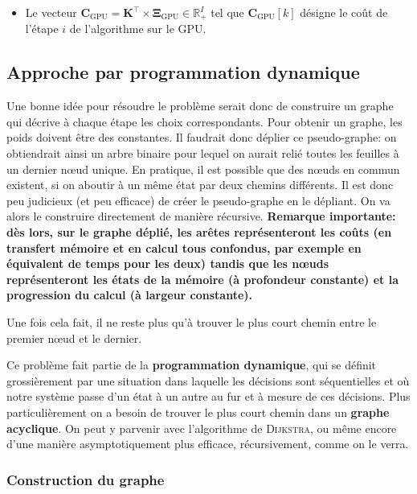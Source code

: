 \documentclass[svgnames,dvipsnames,a4paper,10pt,french]{report}
\begin{document}
\begin{appendices}
\begin{itemize}
    \item Le vecteur $\mathbf{C}_{\text{GPU}} = \mathbf{K}^\intercal \times  \mathbf{\Xi}_{\text{GPU}} \in \mathbb{R}_+^{I}$ tel que $\mathbf{C}_{\text{GPU}}[k]$ désigne le coût de l'étape $i$ de l'algorithme sur le GPU.
\end{itemize}

\subsection{Approche par programmation dynamique}
Une bonne idée pour résoudre le problème serait donc de construire un graphe qui décrive à chaque étape les choix correspondants.  Pour obtenir un graphe, les poids doivent être des constantes. Il faudrait donc \og déplier \fg{} ce pseudo-graphe: on obtiendrait ainsi un arbre binaire pour lequel on aurait relié toutes les feuilles à un dernier n\oe{}ud unique. En pratique, il est  possible que des n\oe{}uds en commun existent, si on aboutir à un même état par deux chemins différents. Il est donc peu judicieux (et peu efficace) de créer le pseudo-graphe en le dépliant. On va alors  le construire directement de manière récursive. \textbf{Remarque importante: dès lors, sur le graphe déplié, les arêtes représenteront les coûts (en transfert mémoire et en calcul tous confondus, par exemple en équivalent de temps pour les deux) tandis que les n\oe{}uds représenteront les états de la mémoire (à profondeur constante) et la progression du calcul (à largeur constante).}

Une fois cela fait, il ne reste plus qu'à trouver le plus court chemin entre le premier n\oe{}ud et le dernier. 

Ce problème fait partie de la \textbf{programmation dynamique}, qui se définit grossièrement par une situation dans laquelle les décisions sont séquentielles et où notre système passe d'un état à un autre au fur et à mesure de ces décisions. Plus particulièrement on a besoin de trouver le plus court chemin dans un \textbf{graphe acyclique}. On peut y parvenir avec l'algorithme de \textsc{Dijkstra}, ou même encore d'une manière asymptotiquement plus efficace, récursivement, comme on le verra.

\subsubsection{Construction du graphe}



\end{appendices}
\end{document}

